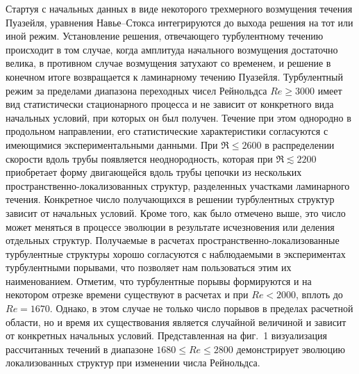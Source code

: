 Стартуя с начальных данных в виде некоторого трехмерного возмущения течения Пуазейля, уравнения Навье--Стокса интегрируются до выхода решения на тот или иной режим. Установление решения, отвечающего турбулентному течению происходит в том случае, когда амплитуда начального возмущения достаточно велика, в противном случае возмущения затухают со временем, и решение в конечном итоге возвращается к ламинарному течению Пуазейля. Турбулентный режим за пределами диапазона переходных чисел Рейнольдса $Re\geqslant3000$ имеет вид статистически стационарного процесса и не зависит от конкретного вида начальных условий, при которых он был получен. Течение при этом однородно в продольном направлении, его статистические характеристики согласуются с имеющимися экспериментальными данными. При $\Re\leqslant2600$ в распределении скорости вдоль трубы появляется неоднородность, которая при $\Re\lesssim2200$ приобретает форму двигающейся вдоль трубы цепочки из нескольких пространственно-локализованных структур, разделенных участками ламинарного течения. Конкретное число получающихся в решении турбулентных структур зависит от начальных условий. Кроме того, как было отмечено выше, это число может меняться в процессе эволюции в результате исчезновения или деления отдельных структур. Получаемые в расчетах пространственно-локализованные турбулентные структуры хорошо согласуются с наблюдаемыми в экспериментах турбулентными порывами, что позволяет нам пользоваться этим их наименованием. Отметим, что турбулентные порывы формируются и на некотором отрезке времени существуют в расчетах и при $Re<2000$, вплоть до $Re=1670$. Однако, в этом случае не только число порывов в пределах расчетной области, но и время их существования является случайной величиной и зависит от конкретных начальных условий. Представленная на фиг.~1 визуализация рассчитанных течений в диапазоне $1680\leqslant Re\leqslant2800$ демонстрирует эволюцию локализованных структур при изменении числа Рейнольдса.





